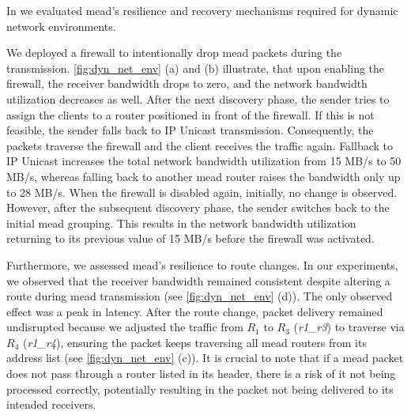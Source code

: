 In \nuciii{} we evaluated \gls{mead}'s resilience and recovery mechanisms
    required for dynamic network environments.

We deployed a firewall to intentionally drop \gls{mead} packets during the
    transmission.
\autoref{fig:dyn_net_env} (a) and (b) illustrate, that upon enabling the firewall,
    the receiver bandwidth drops to zero, and the network bandwidth utilization
    decreases as well.
After the next discovery phase, the sender tries to assign the clients to a
    router positioned in front of the firewall.
If this is not feasible, the sender falls back to IP Unicast transmission.
Consequently, the packets traverse the firewall and the client receives the 
    traffic again.
Fallback to IP Unicast increases the total network bandwidth utilization from
    15 MB/s to 50 MB/s, whereas falling back to another \gls{mead} router raises
    the bandwidth only up to 28 MB/s.
When the firewall is disabled again, initially, no change is observed.
However, after the subsequent discovery phase, the sender switches back to the
    initial \gls{mead} grouping.
This results in the network bandwidth utilization returning to its previous
    value of 15 MB/s before the firewall was activated.

Furthermore, we assessed \gls{mead}'s resilience to route changes.
In our experiments, we observed that the receiver bandwidth remained consistent
    despite altering a route during \gls{mead} transmission (see
    \autoref{fig:dyn_net_env} (d)).
The only observed effect was a peak in latency.
After the route change, packet delivery remained undisrupted because we
    adjusted the traffic from $R_1$ to $R_3$ (\textit{r1\_r3}) to traverse via
    $R_4$ (\textit{r1\_r4}), ensuring the packet keeps traversing all \gls{mead}
    routers from its address list (see \autoref{fig:dyn_net_env} (c)).
It is crucial to note that if a \gls{mead} packet does not pass through a router
    listed in its header, there is a risk of it not being processed correctly,
    potentially resulting in the packet not being delivered to its intended
    receivers. 


